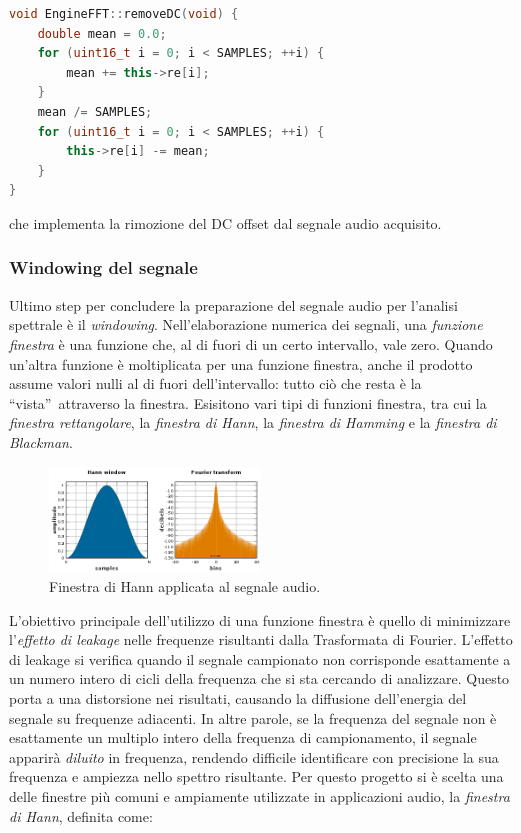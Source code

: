 \documentclass[a4paper,12pt]{report}  %
\begin{document}
\begin{lstlisting}[language=C++,keywords={void, double, float, this, uint16_t, this, for}]
void EngineFFT::removeDC(void) {
    double mean = 0.0;
    for (uint16_t i = 0; i < SAMPLES; ++i) {
        mean += this->re[i];
    }
    mean /= SAMPLES;
    for (uint16_t i = 0; i < SAMPLES; ++i) {
        this->re[i] -= mean;
    }
}
\end{lstlisting}

che implementa la rimozione del DC offset dal segnale audio acquisito.

\subsubsection{Windowing del segnale}\label{sec:windowing}
Ultimo step per concludere la preparazione del segnale audio per l'analisi spettrale è il \textit{windowing}.
Nell'elaborazione numerica dei segnali, una \textit{funzione finestra} è una funzione che, al di fuori di un certo intervallo, vale zero.
Quando un'altra funzione è moltiplicata per una funzione finestra, anche il prodotto assume valori nulli al di fuori dell'intervallo: tutto ciò che resta è la \textquotedblleft vista\textquotedblright \ attraverso la finestra.
Esisitono vari tipi di funzioni finestra, tra cui la \textit{finestra rettangolare}, la \textit{finestra di Hann}, la \textit{finestra di Hamming} e la \textit{finestra di Blackman}.

\begin{figure}[h]
    \centering
    \includegraphics[width=0.5\textwidth]{imgs/Window_function_Hann.png}
    \caption{Finestra di Hann applicata al segnale audio.}
    \label{fig:hann_window}
\end{figure}

L'obiettivo principale dell'utilizzo di una funzione finestra è quello di minimizzare l'\textit{eﬀetto di leakage} nelle frequenze risultanti dalla Trasformata di Fourier.
L'effetto di leakage si verifica quando il segnale campionato non corrisponde esattamente a un numero intero di cicli della frequenza che si sta cercando di analizzare.
Questo porta a una distorsione nei risultati, causando la diffusione dell'energia del segnale su frequenze adiacenti.
In altre parole, se la frequenza del segnale non è esattamente un multiplo intero della frequenza di campionamento, il segnale apparirà \textit{diluito} in frequenza, rendendo difficile identificare con precisione la sua frequenza e ampiezza nello spettro risultante.
Per questo progetto si è scelta una delle finestre più comuni e ampiamente utilizzate in applicazioni audio, la \textit{finestra di Hann}, definita come:
\end{document}
